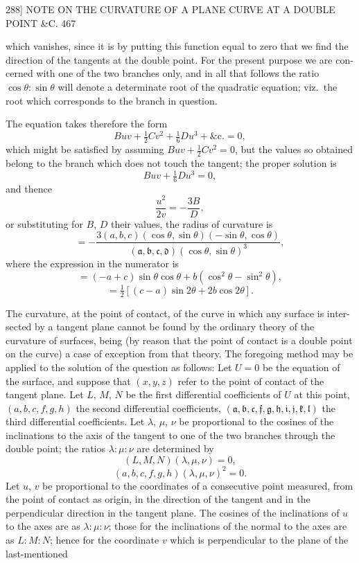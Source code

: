 \documentclass[11pt]{article}
\begin{document}
\begin{center}
\textsc{288]} \hfill NOTE ON THE CURVATURE OF A PLANE CURVE AT A DOUBLE POINT \&C. \hfill 467
\end{center}

which vanishes, since it is by putting this function equal to zero that we find the
direction of the tangents at the double point. For the present purpose we are con-
cerned with one of the two branches only, and in all that follows the ratio $\cos\theta:\sin\theta$
will denote a determinate root of the quadratic equation; viz.\ the root which corresponds
to the branch in question.

\smallskip

The equation takes therefore the form
\[ Buv+\tfrac{1}{2}Cv^{2}+\tfrac{1}{6}Du^{3}+\&\text{c}. =0, \]
which might be satisfied by assuming $Buv+\tfrac{1}{2}Cv^{2}=0$, but the values so obtained belong
to the branch which does not touch the tangent; the proper solution is
\[ Buv+\tfrac{1}{6}Du^{3}=0, \]
and thence
\[ \frac{u^{2}}{2v}=-\frac{3B}{D}, \]
or substituting for $B$, $D$ their values, the radius of curvature is
\[ =-\frac{3(a,b,c)(\cos\theta,\sin\theta)(-\sin\theta,\cos\theta)}{(\mathfrak{a},\mathfrak{b},\mathfrak{c},\mathfrak{d})(\cos\theta,\sin\theta)^{3}}, \]
where the expression in the numerator is
\[ =(-a+c)\sin\theta\cos\theta+b(\cos^{2}\theta-\sin^{2}\theta), \]
\[ =\tfrac{1}{2}[(c-a)\sin 2\theta+2b\cos 2\theta]. \]

\smallskip

The curvature, at the point of contact, of the curve in which any surface is inter-
sected by a tangent plane cannot be found by the ordinary theory of the curvature
of surfaces, being (by reason that the point of contact is a double point on the curve)
a case of exception from that theory. The foregoing method may be applied to the
solution of the question as follows: Let $U=0$ be the equation of the surface, and
suppose that $(x,y,z)$ refer to the point of contact of the tangent plane. Let $L$, $M$, $N$
be the first differential coefficients of $U$ at this point, $(a,b,c,f,g,h)$ the second
differential coefficients, $(\mathfrak{a},\mathfrak{b},\mathfrak{c},\mathfrak{f},\mathfrak{g},\mathfrak{h},\mathfrak{i},\mathfrak{j},\mathfrak{k},\mathfrak{l})$ the third differential coefficients. Let
$\lambda$, $\mu$, $\nu$ be proportional to the cosines of the inclinations to the axis of the tangent
to one of the two branches through the double point; the ratios $\lambda:\mu:\nu$ are
determined by
\[ (L,M,N)(\lambda,\mu,\nu)=0, \]
\[ (a,b,c,f,g,h)(\lambda,\mu,\nu)^{2}=0. \]
Let $u$, $v$ be proportional to the coordinates of a consecutive point measured, from the
point of contact as origin, in the direction of the tangent and in the perpendicular
direction in the tangent plane. The cosines of the inclinations of $u$ to the axes are
as $\lambda:\mu:\nu$; those for the inclinations of the normal to the axes are as $L:M:N$;
hence for the coordinate $v$ which is perpendicular to the plane of the last-mentioned
\end{document}
